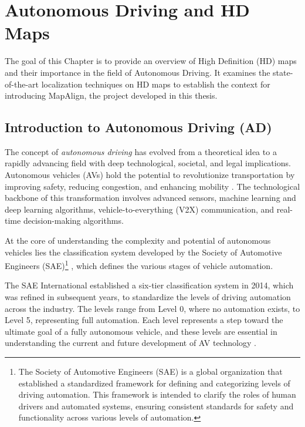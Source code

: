 \NoBgThispage
\chapter{Autonomous Driving and HD Maps}
The goal of this Chapter is to provide an overview of High Definition (HD) maps and their importance in the field of Autonomous Driving. It examines the state-of-the-art localization techniques on HD maps to establish the context for introducing MapAlign, the project developed in this thesis.

\section{Introduction to Autonomous Driving (AD)}
The concept of \textit{autonomous driving} has evolved from a theoretical idea to a rapidly advancing field with deep technological, societal, and legal implications. Autonomous vehicles (AVs) hold the potential to revolutionize transportation by improving safety, reducing congestion, and enhancing mobility \cite{9695620}. The technological backbone of this transformation involves advanced sensors, machine learning and deep learning algorithms, vehicle-to-everything (V2X) communication, and real-time decision-making algorithms.

At the core of understanding the complexity and potential of autonomous vehicles lies the classification system developed by the Society of Automotive Engineers (SAE)\footnote{The Society of Automotive Engineers (SAE) is a global organization that established a standardized framework for defining and categorizing levels of driving automation. This framework is intended to clarify the roles of human drivers and automated systems, ensuring consistent standards for safety and functionality across various levels of automation.} \cite{SAE_J3016_202104}, which defines the various stages of vehicle automation.

The SAE International established a six-tier classification system in 2014, which was refined in subsequent years, to standardize the levels of driving automation across the industry. The levels range from Level 0, where no automation exists, to Level 5, representing full automation. Each level represents a step toward the ultimate goal of a fully autonomous vehicle, and these levels are essential in understanding the current and future development of AV technology \cite{9881892}.

